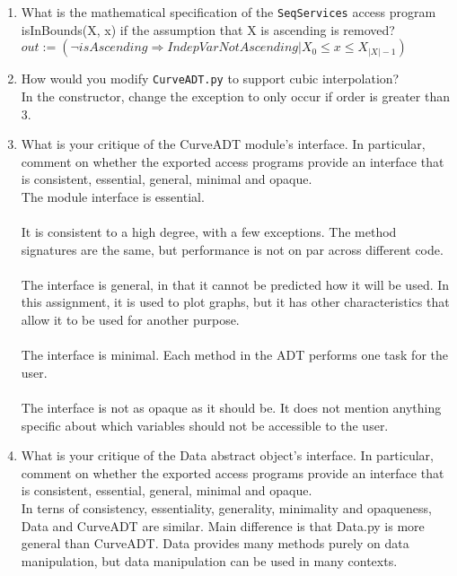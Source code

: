 \documentclass[12pt]{article}
\begin{document}
\begin{enumerate}

\item What is the mathematical specification of the \texttt{SeqServices} access
  program isInBounds(X, x) if the assumption that X is ascending is removed?\\

  $out := (\lnot isAscending \Rightarrow IndepVarNotAscending | X_0 \leq x \leq X_{|X|-1})$

\item How would you modify \texttt{CurveADT.py} to support cubic interpolation?\\

In the constructor, change the exception to only occur if order is greater than 3.\\

\item What is your critique of the CurveADT module's interface.  In particular,
  comment on whether the exported access programs provide an interface that is
  consistent, essential, general, minimal and opaque.\\

  The module interface is essential.\\
  \\
  It is consistent to a high degree, with a few exceptions. The method signatures are the
  same, but performance is not on par across different code.\\
  \\
  The interface is general, in that it cannot be predicted how it will be used. In this 
  assignment, it is used to plot graphs, but it has other characteristics that allow it
  to be used for another purpose. \\
  \\
  The interface is minimal. Each method in the ADT performs one task for the user.\\
  \\
  The interface is not as opaque as it should be. It does not mention anything specific
  about which variables should not be accessible to the user.\\

\item What is your critique of the Data abstract object's interface.  In
  particular, comment on whether the exported access programs provide an
  interface that is consistent, essential, general, minimal and opaque.\\

  In terns of consistency, essentiality, generality, minimality and opaqueness, Data 
  and CurveADT are similar. Main difference is that Data.py is more general than CurveADT.
  Data provides many methods purely on data manipulation, but data manipulation can be 
  used in many contexts. 

\end{enumerate}
\end{document}

